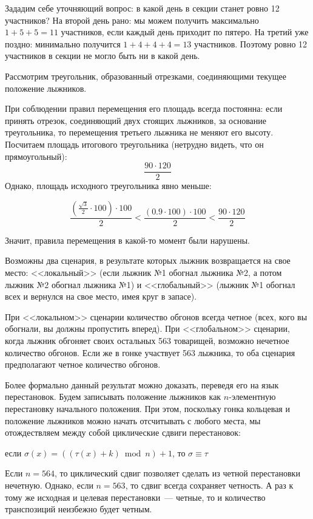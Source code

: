 ﻿
\begin{itemize}
\itA Зададим себе уточняющий вопрос: в какой день в секции станет ровно 12 участников?
На второй день рано: мы можем получить максимально $1+5+5=11$ участников, если каждый день приходит по пятеро.
На третий уже поздно: минимально получится $1+4+4+4=13$ участников. 
Поэтому ровно 12 участников в секции не могло быть ни в какой день.

\itB Рассмотрим треугольник, образованный отрезками, соединяющими текущее положение лыжников.

\begin{center}  \end{center}

При соблюдении правил перемещения его площадь всегда постоянна: если принять
отрезок, соединяющий двух стоящих лыжников, за основание треугольника, 
то перемещения третьего лыжника не меняют его высоту.
Посчитаем площадь итогового треугольника (нетрудно видеть, что он прямоугольный): $$\frac{90\cdot 120}{2}$$
Однако, площадь исходного треугольника явно меньше:

$$\frac{\left(\frac{\sqrt{3}}{2}\cdot 100\right) \cdot 100}{2} < \frac{(0.9 \cdot 100) \cdot 100}{2} < \frac{90 \cdot 120}{2}$$

Значит, правила перемещения в какой-то момент были нарушены.

\itC Возможны два сценария, в результате которых лыжник возвращается на свое место: <<локальный>> 
(если лыжник №1 обогнал лыжника №2, а потом лыжник №2 обогнал лыжника №1) и <<глобальный>>
(лыжник №1 обогнал всех и вернулся на свое место, имея круг в запасе).

При <<локальном>> сценарии количество обгонов всегда четное (всех, кого вы обогнали, вы должны пропустить вперед).
При <<глобальном>> сценарии, когда лыжник обгоняет своих остальных 563 товарищей, возможно нечетное
количество обгонов.
Если же в гонке участвует 563 лыжника, то оба сценария предполагают четное количество обгонов.

Более формально данный результат можно доказать, переведя его на язык перестановок. 
Будем записывать положение лыжников как $n$-элементную перестановку начального 
положения. 
При этом, поскольку гонка кольцевая и положение лыжников
можно начать отсчитывать с любого места, мы отождествляем между собой циклические
сдвиги перестановок: 
\begin{center}если $\sigma(x) = ((\tau(x)+k) \bmod n) + 1$, то $\sigma \equiv \tau$
\end{center}

Если $n = 564$, то циклический сдвиг позволяет сделать из четной перестановки
нечетную. Однако, если $n=563$, то сдвиг всегда сохраняет четность.
А раз к тому же исходная и целевая перестановки~--- четные, 
то и количество транспозиций неизбежно будет четным. 

\end{itemize}
